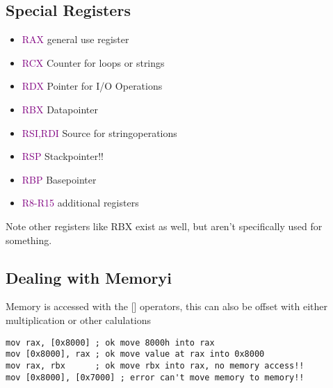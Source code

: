 \documentclass[main.tex,fontsize=8pt,paper=a4,paper=landscape,DIV=calc,]{scrartcl}
\begin{document}
\begin{multicols*}{4}
\subsection{Special Registers}
\begin{itemize}
  \item \textcolor{purple}{RAX} general use register
  \item \textcolor{purple}{RCX} Counter for loops or strings
  \item \textcolor{purple}{RDX} Pointer for I/O Operations
  \item \textcolor{purple}{RBX} Datapointer
  \item \textcolor{purple}{RSI,RDI} Source for stringoperations
  \item \textcolor{purple}{RSP} Stackpointer!!
  \item \textcolor{purple}{RBP} Basepointer
  \item \textcolor{purple}{R8-R15} additional registers
\end{itemize}
Note other registers like RBX exist as well, but aren't specifically used for something.

\subsection{Dealing with Memoryi}
Memory is accessed with the [] operators, this can also be offset with either multiplication or other calulations
\vspace{-2.5mm}
\begin{lstlisting}
mov rax, [0x8000] ; ok move 8000h into rax
mov [0x8000], rax ; ok move value at rax into 0x8000
mov rax, rbx      ; ok move rbx into rax, no memory access!!
mov [0x8000], [0x7000] ; error can't move memory to memory!!
\end{lstlisting}
\vspace{2mm}


\end{multicols*}
\end{document}
